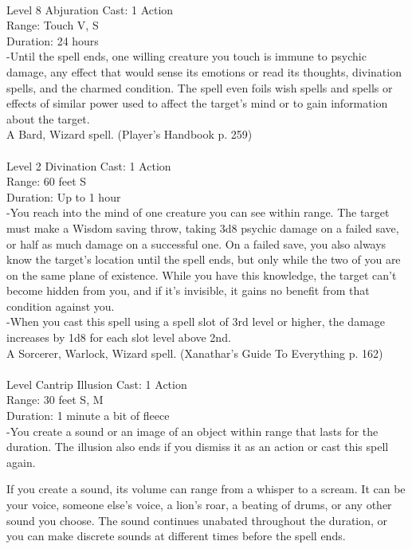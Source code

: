 \documentclass[10pt,twocolumn]{report}
\begin{document}
 \\
Level 8 \quad Abjuration \quad Cast: 1 Action\\
Range: Touch \quad V, S\\
Duration: 24 hours \quad \\
-Until the spell ends, one willing creature you touch is immune to psychic damage, any effect that would sense its emotions or read its thoughts, divination spells, and the charmed condition. The spell even foils wish spells and spells or effects of similar power used to affect the target’s mind or to gain information about the target.\\
A Bard, Wizard spell. (Player's Handbook p. 259) \\


 \\
Level 2 \quad Divination \quad Cast: 1 Action\\
Range: 60 feet \quad S\\
Duration: Up to 1 hour \quad \\
-You reach into the mind of one creature you can see within range. The target must make a Wisdom saving throw, taking 3d8 psychic damage on a failed save, or half as much damage on a successful one. On a failed save, you also always know the target's location until the spell ends, but only while the two of you are on the same plane of existence. While you have this knowledge, the target can’t become hidden from you, and if it’s invisible, it gains no benefit from that condition against you.\\
-When you cast this spell using a spell slot of 3rd level or higher, the damage increases by 1d8 for each slot level above 2nd.\\
A Sorcerer, Warlock, Wizard spell. (Xanathar's Guide To Everything p. 162) \\


 \\
Level Cantrip \quad Illusion \quad Cast: 1 Action\\
Range: 30 feet \quad S, M\\
Duration: 1 minute \quad a bit of fleece\\
-You create a sound or an image of an object within range that lasts for the duration. The illusion also ends if you dismiss it as an action or cast this spell again.

If you create a sound, its volume can range from a whisper to a scream. It can be your voice, someone else’s voice, a lion’s roar, a beating of drums, or any other sound you choose. The sound continues unabated throughout the duration, or you can make discrete sounds at different times before the spell ends.
\end{document}
